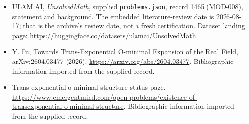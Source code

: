 \documentclass[11pt,a4paper]{article}
\begin{document}
{\small

\begin{itemize}

\item[\hypertarget{source:1465:1}{S1}] ULAM.AI, \emph{UnsolvedMath}, supplied \texttt{problems.json}, record 1465 (MOD-008), statement and background. The embedded literature-review date is 2026-08-17; that is the archive’s review date, not a fresh certification. Dataset landing page: \url{https://huggingface.co/datasets/ulamai/UnsolvedMath}.

\item[\hypertarget{source:1465:2}{S2}] Y. Fu, Towards Trans-Exponential O-minimal Expansion of the Real Field, arXiv:2604.03477 (2026). \url{https://arxiv.org/abs/2604.03477}. Bibliographic information imported from the supplied record.

\item[\hypertarget{source:1465:3}{S3}] Trans-exponential o-minimal structure status page. \url{https://www.emergentmind.com/open-problems/existence-of-transexponential-o-minimal-structure}. Bibliographic information imported from the supplied record.

\end{itemize}

}

\label{end:1465}
\end{document}

